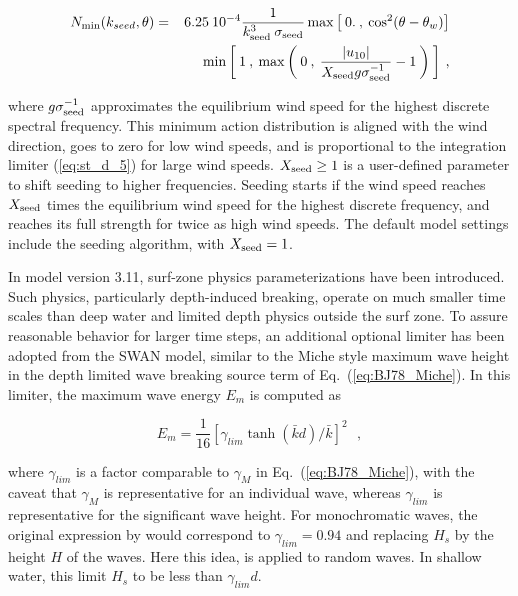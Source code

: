 
\begin{eqnarray}
N_{\min}(k_{seed},\theta) & = & 
        6.25 \: 10^{-4} \frac{1}{k_{\rm seed}^3 \: \sigma_{\rm seed}}
        \max \left [ \: 0. \: , \: \cos^2 ( \theta - \theta_w ) \right ]
                             \nonumber \\ & & \hspace{5mm}
        \min \left [ \: 1 \: , \: \max \left ( \: 0 \: , \: 
        \frac{|u_{10}|}{X_{\rm seed} g \sigma_{\rm seed}^{-1}}-1 
\: \right ) \: \right ] \: , \label{eq:seed} \end{eqnarray}

\noindent
where $g \sigma_{\rm seed}^{-1}$ approximates the equilibrium wind speed for
the highest discrete spectral frequency. This minimum action distribution is
aligned with the wind direction, goes to zero for low wind speeds, and is
proportional to the integration limiter (\ref{eq:st_d_5}) for large wind
speeds. $X_{\rm seed} \geq 1$ is a user-defined parameter to shift seeding to
higher frequencies. Seeding starts if the wind speed reaches $X_{\rm seed}$
times the equilibrium wind speed for the highest discrete frequency, and
reaches its full strength for twice as high wind speeds. The default model
settings include the seeding algorithm, with $X_{\rm seed} = 1$.

In model version 3.11, surf-zone physics parameterizations have been
introduced. Such physics, particularly depth-induced breaking, operate on much
smaller time scales than deep water and limited depth physics outside the surf
zone. To assure reasonable behavior for larger time steps, an additional
optional limiter has been adopted from the SWAN model, similar to the Miche
style maximum wave height in the depth limited wave breaking source term of
Eq.~(\ref{eq:BJ78_Miche}). In this limiter, the maximum wave energy $E_m$ is
computed as


\begin{equation}
E_m = \frac{1}{16} [ \gamma_{lim}  \tanh ( \bar{k} d ) / \bar{k} ] ^2
\:\:\: , \label{eq:MLIM} 
\end{equation}

\noindent
where $\gamma_{lim}$ is a factor comparable to $\gamma_M$ in
Eq.~(\ref{eq:BJ78_Miche}), with the caveat that $\gamma_M$ is representative
for an individual wave, whereas $\gamma_{lim}$ is representative for the
significant wave height. For monochromatic waves, the original expression by \cite{art:Miche44} would correspond to $\gamma_{lim} = 0.94$ and
replacing $H_s$ by the height $H$ of the waves. Here this idea, is applied to random waves. 
In shallow water, this limit $H_s$ to be less than $\gamma_{lim} d$. 

